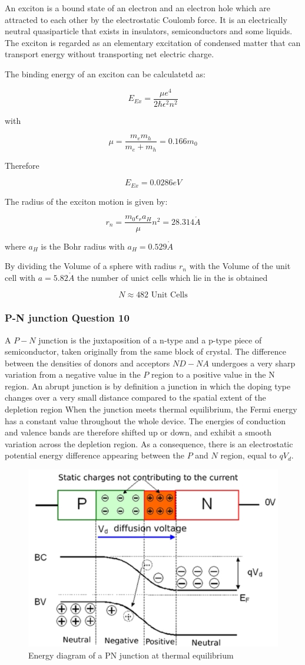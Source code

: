 An exciton is a bound state of an electron and an electron hole which are attracted to each other by the electrostatic Coulomb force. It is an electrically neutral quasiparticle that exists in insulators, semiconductors and some liquids. The exciton is regarded as an elementary excitation of condensed matter that can transport energy without transporting net electric charge.

The binding energy of an exciton can be calculatetd as:

$$E_{Ex} = \frac{\mu e^4}{2\hbar \epsilon^2 n^2}$$

with 

$$\mu = \frac{m_em_h}{m_e+m_h} = 0.166m_0$$

Therefore

$$E_{Ex} = 0.0286 eV$$

The radius of the exciton motion is given by:

$$r_n = \frac{m_0 \epsilon_r a_H}{\mu} n^2= 28.314 \mathring{A}$$

where $a_H$ is the Bohr radius with $a_H = 0.529 \mathring{A}$

By dividing the Volume of a sphere with radius $r_n$ with the Volume
of the unit cell with $a=5.82 \mathring{A}$ the number of unict 
cells which lie in the is obtained

$$N \approx 482 \textrm{ Unit Cells}$$

\subsubsection*{P-N junction Question 10}

A $P-N$ junction is the juxtaposition of a n-type and a p-type piece of semiconductor, taken originally from the same block of crystal. The difference between the densities of donors and acceptors $ND - NA$ undergoes a very sharp variation from a negative value in the $P$ region to a positive value in the N region. An abrupt junction is by definition a junction in which the doping type changes over a very small distance compared to the spatial extent of the depletion region
When the junction meets thermal equilibrium, the Fermi energy has a constant value throughout the whole device. The energies of conduction and valence bands are therefore shifted up or down, and exhibit a smooth variation across the depletion region. As a consequence, there is an electrostatic potential energy difference appearing between the $P$ and $N$ region, equal to $qV_d$.

\begin{figure}[H]
  \centering
  \includegraphics[width=0.35\linewidth]{Graphics/Chapter3/PNjunction.PNG}
  \caption{Energy diagram of a PN junction at thermal equilibrium\cite{PN}}
  \label{fig:PNjunction}
\end{figure}


